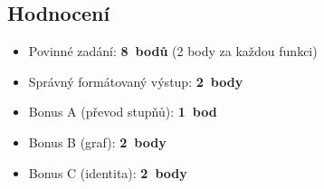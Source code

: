 \documentclass[12pt, a4paper]{article}
\begin{document}
\subsection*{Hodnocení}

\begin{itemize}
    \item Povinné zadání: \textbf{8~bodů} (2 body za každou funkci)
    \item Správný formátovaný výstup: \textbf{2~body}
    \item Bonus A (převod stupňů): \textbf{1~bod}
    \item Bonus B (graf): \textbf{2~body}
    \item Bonus C (identita): \textbf{2~body}
\end{itemize}
\end{document}
